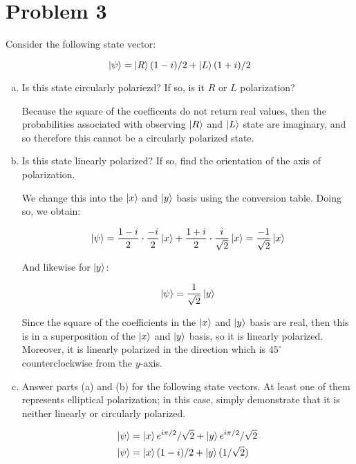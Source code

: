 \documentclass[10pt]{article}
\begin{document}
    \pagebreak

    \section*{Problem 3}

    Consider the following state vector: 

    \[ \ket \psi = \ket R (1 - i)/2 + \ket L (1 + i)/2\] 

    \begin{enumerate}[(a)]
        \item Is this state circularly polariezd? If so, is it $R$ or $L$ polarization?
        
        \begin{solution}
            Because the square of the coefficents do not return real values, then the probabilities associated with observing $\ket R$ and $\ket L$ state are imaginary, and so therefore this cannot be a circularly polarized state.
        \end{solution}

        \item Is this state linearly polarized? If so, find the orientation of the axis of polarization.
        
        \begin{solution}
            We change this into the $\ket x$ and $\ket y$ basis using the conversion table. Doing so, we obtain:

            \[ \ket \psi = \frac{1-i}{2} \cdot \frac{-i}{2} \ket x + \frac{1 + i}{2} \cdot \frac{i}{\sqrt{2}} \ket x = \frac{-1}{\sqrt{2}} \ket x\] 

            And likewise for $\ket y$: 

            \[ \ket \psi = \frac{1}{\sqrt{2}}\ket y\]

            Since the square of the coefficients in the $\ket x$ and $\ket y$ basis are real, then this is in a superposition of the $\ket x$ and $\ket y$ basis, so it is linearly polarized. Moreover, it is linearly polarized in the direction which is $45^\circ$ counterclockwise from the $y$-axis.
        \end{solution}

        \item Answer parts (a) and (b) for the following state vectors. At least one of them represents elliptical polarization; in this case, simply demonstrate that it is neither linearly or circularly polarized. 
        
        \begin{align*}
            \ket \psi &= \ket x e^{i\pi/2}/\sqrt 2 + \ket y e^{i \pi/2}/\sqrt 2\\
            \ket \psi &= \ket x (1-i)/2 + \ket y (1/\sqrt 2)
        \end{align*}


\end{enumerate}
\end{document}

